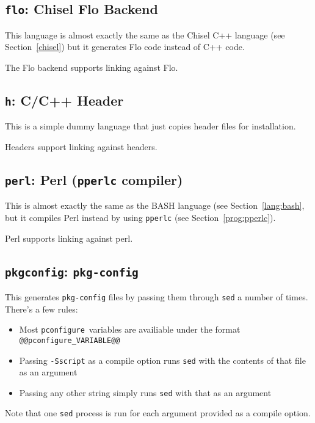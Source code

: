 \documentclass{article}
\newcommand{\pconfigure}{\texttt{pconfigure}}
\begin{document}
\subsection{\texttt{flo}: Chisel Flo Backend}

This language is almost exactly the same as the Chisel C++ language
(see Section~\ref{chisel}) but it generates Flo code instead of C++
code.

The Flo backend supports linking against Flo.

\subsection{\texttt{h}: C/C++ Header}

This is a simple dummy language that just copies header files for
installation.

Headers support linking against headers.

\subsection{\texttt{perl}: Perl (\texttt{pperlc} compiler)}

This is almost exactly the same as the BASH language (see
Section~\ref{lang:bash}, but it compiles Perl instead by using
\texttt{pperlc} (see Section~\ref{prog:pperlc}).

Perl supports linking against perl.

\subsection{\texttt{pkgconfig}: \texttt{pkg-config}}

This generates \texttt{pkg-config} files by passing them through
\texttt{sed} a number of times.  There's a few rules:

\begin{itemize}
\item Most \pconfigure\ variables are availiable under the format
  \texttt{@@pconfigure\_VARIABLE@@}
\item Passing \texttt{-Sscript} as a compile option runs \texttt{sed}
  with the contents of that file as an argument
\item Passing any other string simply runs \texttt{sed} with that as
  an argument
\end{itemize}

Note that one \texttt{sed} process is run for each argument provided
as a compile option.
\end{document}
